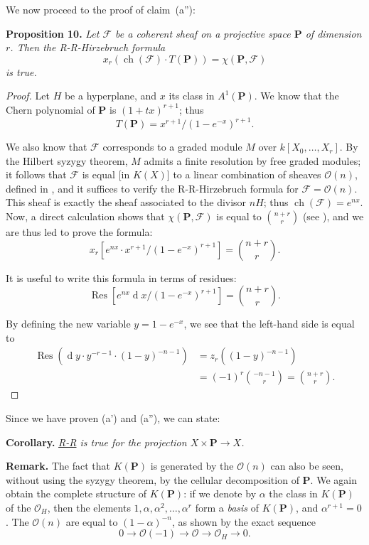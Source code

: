 \documentclass{article}
\newenvironment{itenv}[1]
  {\phantomsection\par\medskip\noindent\textbf{#1.}\itshape}
  {\par\medskip}
\newenvironment{rmenv}[1]
  {\phantomsection\par\medskip\noindent\textbf{#1.}\rmfamily}
  {\par\medskip}
\newcommand{\scr}[1]{{\mathscr{#1}}}
\newcommand{\PP}{\mathbf{P}}
\newcommand{\dd}{\operatorname{d}\!}
\DeclareMathOperator{\ch}{ch}
\newcommand{\oldpage}[1]{\marginpar{\footnotesize$\Big\vert$ \textit{p.~#1}}}
\begin{document}
We now proceed to the proof of claim~(a''):

\begin{itenv}{Proposition 10}
\label{proposition10}
  Let $\scr{F}$ be a coherent sheaf on a projective space $\PP$
\oldpage{119}
  of dimension $r$.
  Then the R-R-Hirzebruch formula
  \[
    x_r(\ch(\scr{F})\cdot T(\PP)) = \chi(\PP,\scr{F})
  \]
  is true.
\end{itenv}

\begin{proof}
  Let $H$ be a hyperplane, and $x$ its class in $A^1(\PP)$.
  We know that the Chern polynomial of $\PP$ is $(1+tx)^{r+1}$;
  thus
  \[
    T(\PP) = x^{r+1}/(1-e^{-x})^{r+1}.
  \]

  We also know that $\scr{F}$ corresponds to a graded module $M$ over $k[X_0,\ldots,X_r]$.
  By the Hilbert syzygy theorem, $M$ admits a finite resolution by free graded modules;
  it follows that $\scr{F}$ is equal [in $K(X)$] to a linear combination of sheaves $\scr{O}(n)$, defined in \cite[p.~246]{12}, and it suffices to verify the R-R-Hirzebruch formula for $\scr{F}=\scr{O}(n)$.
  This sheaf is exactly the sheaf associated to the divisor $nH$;
  thus $\ch(\scr{F})=e^{nx}$.
  Now, a direct calculation shows that $\chi(\PP,\scr{F})$ is equal to $\binom{n+r}{r}$ (see \cite[p.~275]{12}), and we are thus led to prove the formula:
  \[
  \label{10equation*}
    x_r[e^{nx}\cdot x^{r+1}/(1-e^{-x})^{r+1}] = \binom{n+r}{r}.
    \tag{$\star$}
  \]

  It is useful to write this formula in terms of residues:
  \[
  \label{10equation**}
    \operatorname{Res}[e^{nx}\dd x/(1-e^{-x})^{r+1}] = \binom{n+r}{r}.
    \tag{$\star\star$}
  \]

  By defining the new variable $y=1-e^{-x}$, we see that the left-hand side is equal to
  \begin{align*}
    \operatorname{Res}(\dd y\cdot y^{-r-1}\cdot(1-y)^{-n-1})
    &= z_r((1-y)^{-n-1})
  \\&= (-1)^r\binom{-n-1}{r}
    = \binom{n+r}{r}.
  \end{align*}
\end{proof}

Since we have proven (a') and (a''), we can state:

\begin{itenv}{Corollary}
  \hyperref[theoremriemannroch]{R-R} is true for the projection $X\times\PP\to X$.
\end{itenv}

\begin{rmenv}{Remark}
  The fact that $K(\PP)$ is generated by the $\scr{O}(n)$ can also be seen, without using the syzygy theorem, by the cellular decomposition of $\PP$.
  We again obtain the complete structure of $K(\PP)$:
  if we denote by $\alpha$ the class in $K(\PP)$ of the $\scr{O}_H$, then the elements $1,\alpha,\alpha^2,\ldots,\alpha^r$ form a \emph{basis} of $K(\PP)$, and $\alpha^{r+1}=0$.
  The $\scr{O}(n)$ are equal to $(1-\alpha)^{-n}$, as shown by the exact sequence
  \[
    0 \to \scr{O}(-1) \to \scr{O} \to \scr{O}_H \to 0.
  \]
\end{rmenv}
\end{document}
